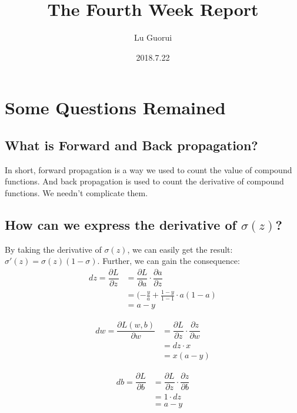 \documentclass{article}
\title{The Fourth Week Report}
\author{Lu Guorui}
\date{2018.7.22}
\begin{document}
\maketitle
\renewcommand{\contentsname}{Contents}
\tableofcontents
\newpage


\section{Some Questions Remained}

\subsection{What is Forward and Back propagation?}
\indent In short, forward propagation is a way we used to count the value of compound functions. And back propagation is used to count the derivative of compound functions. We needn't complicate them.

\subsection{How can we express the derivative of $\sigma(z)$?}
\indent By taking the derivative of $\sigma(z)$, we can easily get the result:$\sigma'(z)=\sigma(z)(1-\sigma)$.
\indent Further, we can gain the consequence:
\begin{align}
dz = \dfrac{\partial L}{\partial z} &= \dfrac{\partial L}{\partial a}\cdot\dfrac{\partial a}{\partial z}  \\
&= (-\frac{y}{a}+\frac{1-y}{1-1}\cdot a(1-a) \\
&= a-y
\end{align}

\begin{align}
dw = \dfrac{\partial L(w,b)}{\partial w}&=\dfrac{\partial L}{\partial z}\cdot\dfrac{\partial z}{\partial w} \\
&=dz\cdot x  \\
&=x(a-y) 
\end{align}

\begin{align}
db = \dfrac{\partial L}{\partial b} &=\dfrac{\partial L}{\partial z}\cdot\dfrac{\partial z}{\partial b}  \\
&= 1\cdot dz \\
&= a-y
\end{align}
\end{document}
